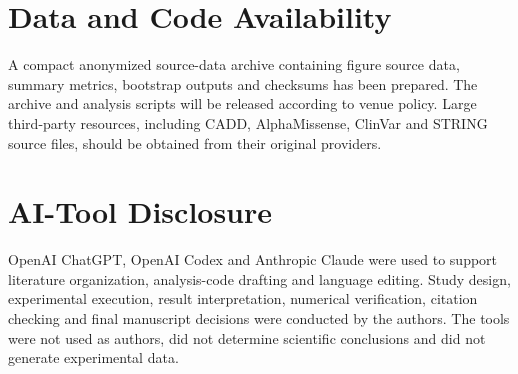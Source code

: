 \documentclass[conference]{IEEEtran}
\begin{document}
\section*{Data and Code Availability}

A compact anonymized source-data archive containing figure source data, summary metrics, bootstrap outputs and checksums has been prepared. The archive and analysis scripts will be released according to venue policy. Large third-party resources, including CADD, AlphaMissense, ClinVar and STRING source files, should be obtained from their original providers.

\section*{AI-Tool Disclosure}

OpenAI ChatGPT, OpenAI Codex and Anthropic Claude were used to support literature organization, analysis-code drafting and language editing. Study design, experimental execution, result interpretation, numerical verification, citation checking and final manuscript decisions were conducted by the authors. The tools were not used as authors, did not determine scientific conclusions and did not generate experimental data.
\end{document}
